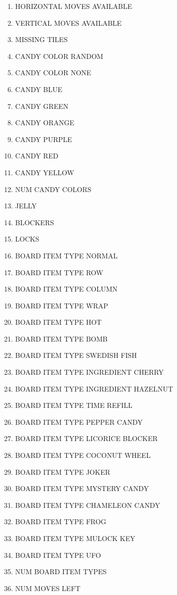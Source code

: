 \documentclass{kththesis}
\begin{document}
\begin{multicols}{2}
\begin{enumerate}
\label{tab:feature_planes}
\item HORIZONTAL MOVES AVAILABLE
\item VERTICAL MOVES AVAILABLE
\item MISSING TILES
\item CANDY COLOR RANDOM
\item CANDY COLOR NONE
\item CANDY BLUE
\item CANDY GREEN
\item CANDY ORANGE
\item CANDY PURPLE
\item CANDY RED
\item CANDY YELLOW
\item NUM CANDY COLORS
\item JELLY
\item BLOCKERS
\item LOCKS
\item BOARD ITEM TYPE NORMAL
\item BOARD ITEM TYPE ROW
\item BOARD ITEM TYPE COLUMN
\item BOARD ITEM TYPE WRAP
\item BOARD ITEM TYPE HOT
\item BOARD ITEM TYPE BOMB
\item BOARD ITEM TYPE SWEDISH FISH
\item BOARD ITEM TYPE INGREDIENT CHERRY
\item BOARD ITEM TYPE INGREDIENT HAZELNUT
\item BOARD ITEM TYPE TIME REFILL
\item BOARD ITEM TYPE PEPPER CANDY
\item BOARD ITEM TYPE LICORICE BLOCKER
\item BOARD ITEM TYPE COCONUT WHEEL
\item BOARD ITEM TYPE JOKER
\item BOARD ITEM TYPE MYSTERY CANDY
\item BOARD ITEM TYPE CHAMELEON CANDY
\item BOARD ITEM TYPE FROG
\item BOARD ITEM TYPE MULOCK KEY
\item BOARD ITEM TYPE UFO
\item NUM BOARD ITEM TYPES
\item NUM MOVES LEFT
\end{enumerate}
\end{multicols}
\end{document}
